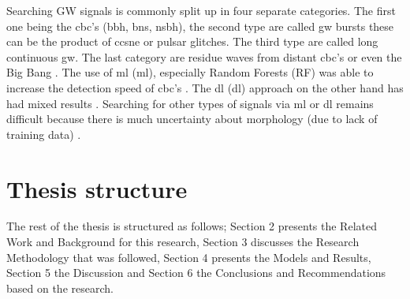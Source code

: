Searching GW signals is commonly split up in four separate categories. The first one being the \acrshort{cbc}'s (\acrshort{bbh}, \acrshort{bns}, \acrshort{nsbh}), the second type are called \acrshort{gw} bursts these can be the product of \acrshort{ccsne} or pulsar glitches. The third type are called long continuous \acrshort{gw}. The last category are residue waves from distant \acrshort{cbc}'s or even the Big Bang
\citep{abbott2020guide, LIGO_continuous}. The use of \acrlong{ml} (\acrshort{ml}), especially Random Forests (RF) was able to increase the detection speed of \acrshort{cbc}'s \citep{kapadia2017classifier}. The \acrlong{dl} (\acrshort{dl}) approach on the other hand has had mixed results \citep{gebhard2019convolutional,chatterjee2021extraction,ruan2023rapid}. 
Searching for other types of signals via \acrshort{ml} or \acrshort{dl} remains difficult because there is much uncertainty about morphology (due to lack of training data) \citep{cuoco2020enhancing}. 



\section{Thesis structure}
The rest of the thesis is structured as follows; Section 2 presents the Related Work and Background for this research, Section 3 discusses the Research Methodology that was followed, Section 4 presents the Models and Results, Section 5 the Discussion and Section 6 the Conclusions and Recommendations based on the research.  \\

\newpage



